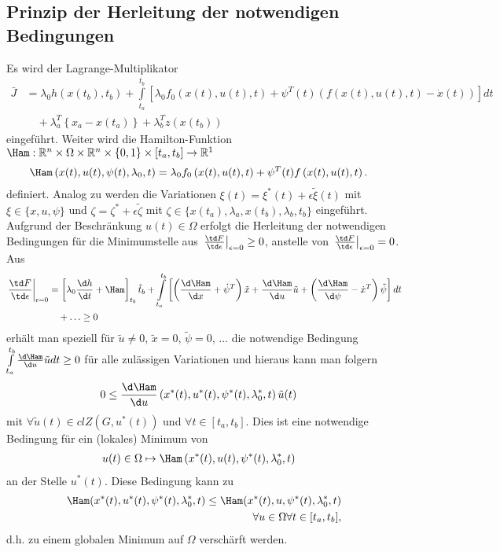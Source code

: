\subsection{Prinzip der Herleitung der notwendigen Bedingungen}
Es wird der Lagrange-Multiplikator
\begin{align*}
	\bar{J} & = \lambda_0 h\left(x(t_b),t_b \right) + \int\limits_{t_a}^{t_b}\left[\lambda_0 f_0(x(t),u(t),t) + \psi^T(t)\left(f(x(t),u(t),t) -
	\dot{x}(t) \right) \right]dt\\
	&\quad + \lambda_a^T\left\{x_a - x(t_a) \right\} + \lambda_b^T z(x(t_b))
\end{align*}
eingeführt. Weiter wird die Hamilton-Funktion $\Ham:\mathbb{R}^n\times\Omega\times\mathbb{R}^n\times\{0,1\}\times[t_a,t_b]\rightarrow\mathbb{R}^1$
\begin{align*}
	\Ham \left(x(t),u(t),\psi(t),\lambda_0,t \right) & = \lambda_0 f_0\left(x(t),u(t),t \right) + \psi^T(t)f\left(x(t),u(t),t \right). 
\end{align*}
definiert. Analog zu  werden die Variationen $\xi(t)=\xi^{\ast}(t)+\epsilon\tilde{\xi}(t)$ mit
$\xi\in\{x,u,\psi \}$ und $\zeta=\zeta^{\ast}+\epsilon\tilde{\zeta}$ mit $\zeta\in\{x(t_a),\lambda_a, x(t_b), \lambda_b, t_b\}$ eingeführt. Aufgrund
der Beschränkung $u(t)\in\Omega$ erfolgt die Herleitung der notwendigen Bedingungen für die Minimumstelle aus $\left.\frac{\td F}{\td
\epsilon}\right|_{\epsilon=0}\geq 0$, anstelle von $\left.\frac{\td F}{\td \epsilon}\right|_{\epsilon=0} = 0$. Aus 
\begin{align*}
	\left.\frac{\td F}{\td \epsilon}\right|_{\epsilon=0} & = \left[\lambda_0\frac{\d h}{\d t}+\Ham \right]_{t_b}\tilde{t}_b +
	\int\limits_{t_a}^{t_b}\left[\left(\frac{\d \Ham}{\d x}+\dot{\psi}^T \right)\tilde{x} + \frac{\d \Ham}{\d u}\tilde{u} + \left(\frac{\d \Ham}{\d \psi}
	-\dot{x}^T \right)\tilde{\psi}\right]dt\\
	& \quad + \ldots \geq 0
\end{align*}
erhält man speziell für $\tilde{u}\neq 0$, $\tilde{x}=0$, $\tilde{\psi}=0$, $\ldots$ die notwendige Bedingung $\int\limits_{t_a}^{t_b}\frac{\d\Ham}{\d
u}\tilde{u}dt\geq 0$ für alle zulässigen Variationen und hieraus kann man folgern
\begin{align*}
0 & \leq \frac{\d \Ham}{\d u}\left(x^{\ast}(t), u^{\ast}(t), \psi^{\ast}(t),\lambda_0^{\ast},t \right)\tilde{u}(t)
\end{align*}
mit $\forall \tilde{u}(t)\in clZ(G,u^{\ast}(t))$ und $\forall t\in[t_a,t_b]$. Dies ist eine notwendige Bedingung für ein (lokales) Minimum von
\begin{align*}
	u(t)\in\Omega & \mapsto \Ham\left(x^{\ast}(t), u(t), \psi^{\ast}(t),\lambda_0^{\ast},t \right) 
\end{align*}
an der Stelle $u^{\ast}(t)$. Diese Bedingung kann zu
\begin{align*}
\Ham(x^{\ast}(t), u^{\ast}(t), \psi^{\ast}(t), \lambda_0^{\ast},t) \le \Ham(x^{\ast}(t), u, \psi^{\ast}(t), \lambda_0^{\ast},t) \\
\forall u \in \Omega \forall t \in [t_a,t_b],
\end{align*}
d.h. zu einem globalen Minimum auf $\Omega$ verschärft werden.

